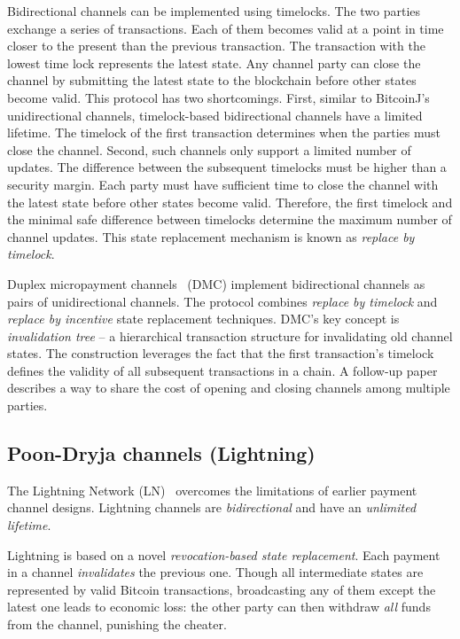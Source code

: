 Bidirectional channels can be implemented using timelocks.
The two parties exchange a series of transactions.
Each of them becomes valid at a point in time closer to the present than the previous transaction.
The transaction with the lowest time lock represents the latest state.
Any channel party can close the channel by submitting the latest state to the blockchain before other states become valid.
This protocol has two shortcomings.
First, similar to BitcoinJ's unidirectional channels, timelock-based bidirectional channels have a limited lifetime.
The timelock of the first transaction determines when the parties must close the channel.
Second, such channels only support a limited number of updates.
The difference between the subsequent timelocks must be higher than a security margin.
Each party must have sufficient time to close the channel with the latest state before other states become valid.
Therefore, the first timelock and the minimal safe difference between timelocks determine the maximum number of channel updates.
This state replacement mechanism is known as \textit{replace by timelock}.

Duplex micropayment channels~\cite{Decker2015} (DMC) implement bidirectional channels as pairs of unidirectional channels.
The protocol combines \textit{replace by timelock} and \textit{replace by incentive} state replacement techniques.
DMC's key concept is \textit{invalidation tree} -- a hierarchical transaction structure for invalidating old channel states.
The construction leverages the fact that the first transaction's timelock defines the validity of all subsequent transactions in a chain.
A follow-up paper~\cite{Burchert2017} describes a way to share the cost of opening and closing channels among multiple parties.


\subsection{Poon-Dryja channels (Lightning)}

The Lightning Network (LN)~\cite{Poon2016} overcomes the limitations of earlier payment channel designs.
Lightning channels are \textit{bidirectional} and have an \textit{unlimited lifetime}.

Lightning is based on a novel \textit{revocation-based state replacement}.
Each payment in a channel \textit{invalidates} the previous one.
Though all intermediate states are represented by valid Bitcoin transactions, broadcasting any of them except the latest one leads to economic loss: the other party can then withdraw \textit{all} funds from the channel, punishing the cheater.

